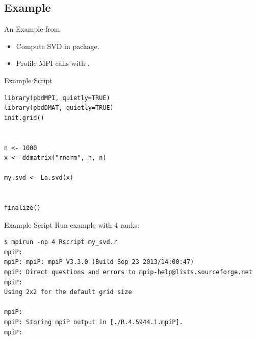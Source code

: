 \subsection{Example}
\makesubcontentsslidessec

\begin{frame}
  \begin{block}{An Example from }
    \begin{itemize}
      \item Compute SVD in  package.
      \item Profile MPI calls with .
    \end{itemize}
   \end{block}
\end{frame}

\begin{frame}[fragile]
  \begin{block}{Example Script}
\begin{lstlisting}[title=my\_svd.r]
library(pbdMPI, quietly=TRUE)
library(pbdDMAT, quietly=TRUE)
init.grid()


n <- 1000
x <- ddmatrix("rnorm", n, n)

my.svd <- La.svd(x)


finalize()
\end{lstlisting}
  \end{block}
\end{frame}

\begin{frame}[fragile]
  \begin{block}{Example Script}
Run example with 4 ranks:
\begin{lstlisting}[language=shl]
$ mpirun -np 4 Rscript my_svd.r
mpiP: 
mpiP: mpiP: mpiP V3.3.0 (Build Sep 23 2013/14:00:47)
mpiP: Direct questions and errors to mpip-help@lists.sourceforge.net
mpiP: 
Using 2x2 for the default grid size

mpiP: 
mpiP: Storing mpiP output in [./R.4.5944.1.mpiP].
mpiP: 
\end{lstlisting}
  \end{block}
\end{frame}



